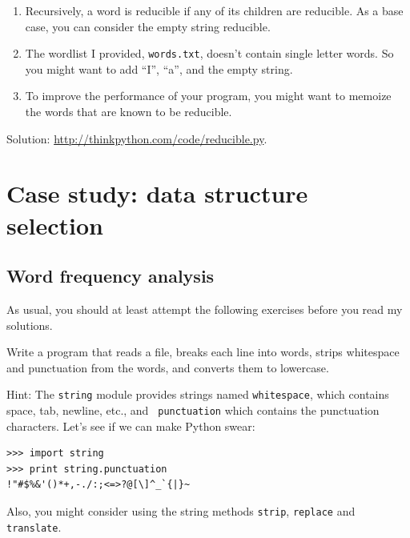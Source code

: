 \documentclass[10pt]{book}
\begin{document}
\begin{exercise}
\begin{enumerate}
\item Recursively, a word is reducible if any of its children
are reducible.  As a base case, you can consider the empty
string reducible.

\item The wordlist I provided, {\tt words.txt}, doesn't
contain single letter words.  So you might want to add
``I'', ``a'', and the empty string.

\item To improve the performance of your program, you might want
to memoize the words that are known to be reducible.

\end{enumerate}

Solution: \url{http://thinkpython.com/code/reducible.py}.

\end{exercise}








\chapter{Case study: data structure selection}

\section{Word frequency analysis}
\label{analysis}

As usual, you should at least attempt the following exercises
before you read my solutions.

\begin{exercise}

Write a program that reads a file, breaks each line into
words, strips whitespace and punctuation from the words, and
converts them to lowercase.

Hint: The {\tt string} module provides strings named {\tt whitespace},
which contains space, tab, newline, etc., and {\tt
  punctuation} which contains the punctuation characters.  Let's see
if we can make Python swear:

\begin{verbatim}
>>> import string
>>> print string.punctuation
!"#$%&'()*+,-./:;<=>?@[\]^_`{|}~
\end{verbatim}
%
Also, you might consider using the string methods {\tt strip},
{\tt replace} and {\tt translate}.

\end{exercise}
\end{document}
